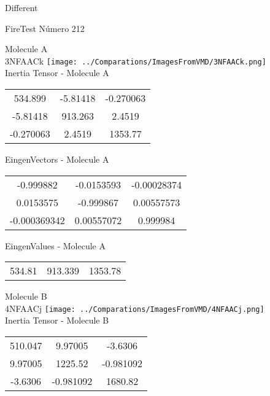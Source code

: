 \begin{center}
\vtab
\vtab
\textcolor{NavyBlue}{\Large Different}
\end{center}

 \newpage

\vtab[-2cm]
\begin{center}
{\large FireTest \tab Número 212}
\end{center}
\begin{multicols}{2}
\begin{center}

Molecule A \\ 
3NFAACk
\texttt{[image: ../Comparations/ImagesFromVMD/3NFAACk.png]}
\\
Inertia Tensor - Molecule A \\
\vtab

\begin{tabular}{|c c c|}
534.899	 & 	-5.81418	 & 	-0.270063	 \\
-5.81418	 & 	913.263	 & 	2.4519	 \\
-0.270063	 & 	2.4519	 & 	1353.77
\end{tabular}

\vtab
 EingenVectors - Molecule A     \\
\vtab
\begin{tabular}{|c c c|}
-0.999882	 & 	-0.0153593	 & 	-0.00028374	 \\
0.0153575	 & 	-0.999867	 & 	0.00557573	 \\
-0.000369342	 & 	0.00557072	 & 	0.999984
\end{tabular}

\vtab
 EingenValues - Molecule A     \\
\vtab
\begin{tabular}{|c c c|}
534.81	 & 	913.339	 & 	1353.78	 \\
\end{tabular}
\columnbreak

Molecule B \\ 
4NFAACj
\texttt{[image: ../Comparations/ImagesFromVMD/4NFAACj.png]}
\\
Inertia Tensor - Molecule B \\
\vtab

\begin{tabular}{|c c c|}
510.047	 & 	9.97005	 & 	-3.6306	 \\
9.97005	 & 	1225.52	 & 	-0.981092	 \\
-3.6306	 & 	-0.981092	 & 	1680.82
\end{tabular}


\end{center}
\end{multicols}
